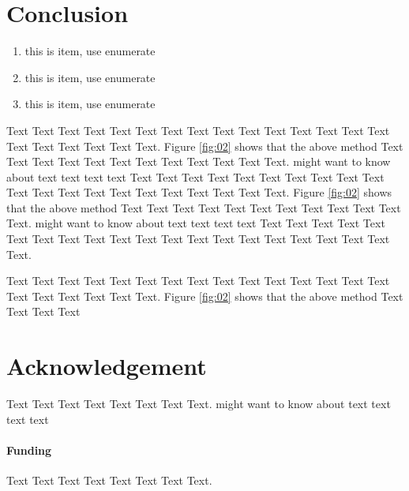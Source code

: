 \documentclass{bioinfo}
\begin{document}
\section{Conclusion}
\label{sec::con}



\begin{enumerate}
\item this is item, use enumerate
\item this is item, use enumerate
\item this is item, use enumerate
\end{enumerate}

Text Text Text Text Text Text  Text Text Text Text Text Text Text Text Text  Text Text Text Text Text Text. Figure \ref{fig:02} shows that the above method  Text Text Text Text  Text Text Text Text Text Text  Text Text.  \citealp{Boffelli03} might want to know about  text text text text
Text Text Text Text Text Text  Text Text Text Text Text Text Text Text Text  Text Text Text Text Text Text. Figure \ref{fig:02} shows that the above method  Text Text Text Text  Text Text Text Text Text Text  Text Text.  \citealp{Boffelli03} might want to know about  text text text text
Text Text Text Text Text Text  Text Text Text Text Text Text Text Text Text  Text Text Text Text Text Text.






Text Text Text Text Text Text  Text Text Text Text Text Text Text Text Text  Text Text Text Text Text Text. Figure \ref{fig:02} shows that the above method  Text Text Text Text


\section*{Acknowledgement}
Text Text Text Text Text Text  Text Text.  \citealp{Boffelli03} might want to know about  text text text text

\paragraph{Funding\textcolon} Text Text Text Text Text Text  Text Text.

%
%
%
%
%
%
%
%
%
\end{document}
